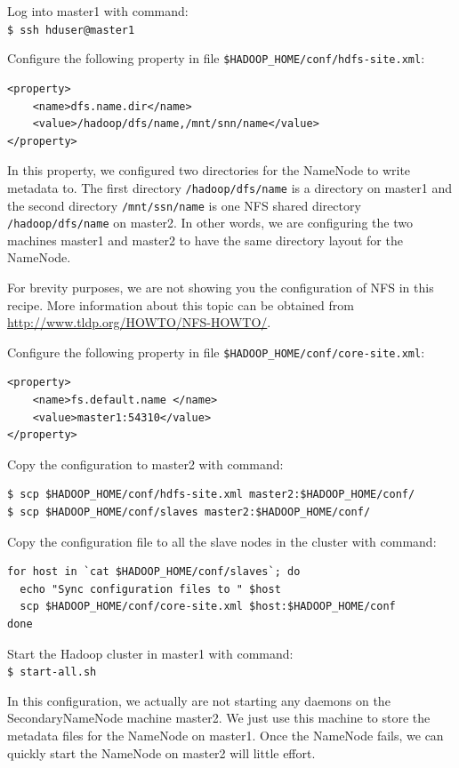 Log into master1 with command: \\
\verb|$ ssh hduser@master1|

Configure the following property in file \verb|$HADOOP_HOME/conf/hdfs-site.xml|:
\lstset{style=bashstyle}
\begin{lstlisting}
<property>
    <name>dfs.name.dir</name>
    <value>/hadoop/dfs/name,/mnt/snn/name</value>
</property>
\end{lstlisting}

In this property, we configured two directories for the NameNode to write metadata to. The first directory \verb|/hadoop/dfs/name| is a directory on master1 and the second directory \verb|/mnt/ssn/name| is one NFS shared directory \verb|/hadoop/dfs/name| on master2. In other words, we are configuring the two machines master1 and master2 to have the same directory layout for the NameNode.

For brevity purposes, we are not showing you the configuration of NFS in this recipe. More information about this topic can be obtained from \url{http://www.tldp.org/HOWTO/NFS-HOWTO/}.

Configure the following property in file \verb|$HADOOP_HOME/conf/core-site.xml|:
\lstset{style=bashstyle}
\begin{lstlisting}
<property>
    <name>fs.default.name </name>
    <value>master1:54310</value>
</property>
\end{lstlisting}

Copy the configuration to master2 with command:
\lstset{style=bashstyle}
\begin{lstlisting}
$ scp $HADOOP_HOME/conf/hdfs-site.xml master2:$HADOOP_HOME/conf/
$ scp $HADOOP_HOME/conf/slaves master2:$HADOOP_HOME/conf/
\end{lstlisting}

Copy the configuration file to all the slave nodes in the cluster with command:
\lstset{style=bashstyle}
\begin{lstlisting}
for host in `cat $HADOOP_HOME/conf/slaves`; do
  echo "Sync configuration files to " $host
  scp $HADOOP_HOME/conf/core-site.xml $host:$HADOOP_HOME/conf
done
\end{lstlisting}

Start the Hadoop cluster in master1 with command: \\
\verb|$ start-all.sh|

In this configuration, we actually are not starting any daemons on the SecondaryNameNode machine master2. We just use this machine to store the metadata files for the NameNode on master1. Once the NameNode fails, we can quickly start the NameNode on master2 will little effort.

